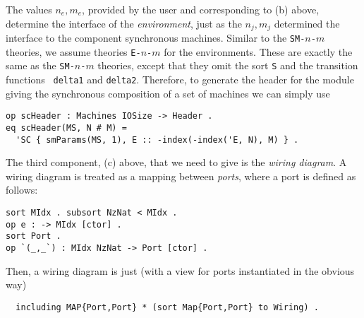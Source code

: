 \documentclass[copyright,creativecommons]{eptcs}
\begin{document}
The values $n_e,m_e$, provided by the user and corresponding to (b) above,
determine the interface of the \emph{environment}, just as the $n_j,m_j$
determined the interface to the component synchronous machines.  Similar to the
{\tt SM-$n$-$m$} theories, we assume theories {\tt E-$n$-$m$} for the
environments. These are exactly the same as the {\tt SM-$n$-$m$} theories,
except that they omit the sort {\tt S} and the transition functions {\tt
delta1} and {\tt delta2}. Therefore, to generate the header for the module
giving the synchronous composition of a set of machines we can simply use

\begin{center}
\begin{small}
\begin{boxedminipage}{0.80\textwidth}
\begin{verbatim}
op scHeader : Machines IOSize -> Header .
eq scHeader(MS, N # M) = 
  'SC { smParams(MS, 1), E :: -index(-index('E, N), M) } .
\end{verbatim}
\end{boxedminipage}
\end{small}
\end{center}

The third component, (c) above, that we need to give is the \emph{wiring
diagram}. A wiring diagram is treated as a mapping between \emph{ports}, where
a port is defined as follows:

\begin{center}
\begin{small}
\begin{boxedminipage}{0.50\textwidth}
\begin{verbatim}
sort MIdx . subsort NzNat < MIdx . 
op e : -> MIdx [ctor] . 
sort Port . 
op `(_,_`) : MIdx NzNat -> Port [ctor] .
\end{verbatim}
\end{boxedminipage}
\end{small}
\end{center}

\noindent
Then, a wiring diagram is just (with a view for ports instantiated in the obvious way)

\begin{center}
\begin{small}
\begin{boxedminipage}{0.75\textwidth}
\begin{verbatim}
  including MAP{Port,Port} * (sort Map{Port,Port} to Wiring) .
\end{verbatim}
\end{boxedminipage}
\end{small}
\end{center}
\end{document}
